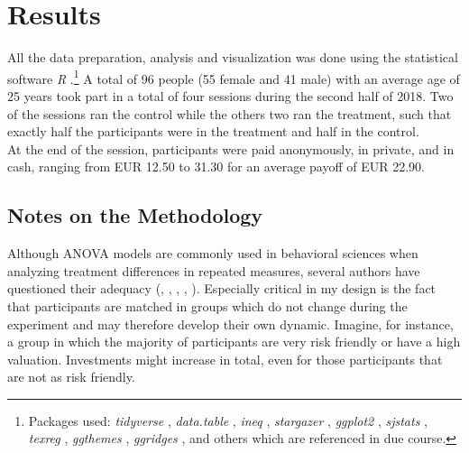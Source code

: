 \chapter{Results}
\label{ch:results}
\thispagestyle{fancy}

All the data preparation, analysis and visualization was done using the statistical software \textit{R} \citep{rcoreteam2014}.\footnote{Packages used: \textit{tidyverse} \citep{wickham2017b}, \textit{data.table} \citep{dowle2018}, \textit{ineq} \citep{zeileis2014}, \textit{stargazer} \citep{hlavac2018}, \textit{ggplot2} \citep{wickham2016}, \textit{sjstats} \citep{ludecke2018}, \textit{texreg} \citep{leifeld2013}, \textit{ggthemes} \citep{arnold2018}, \textit{ggridges} \citep{wilke2018}, and others which are referenced in due course.} A total of 96 people (55 female and 41 male) with an average age of 25 years took part in a total of four sessions during the second half of 2018. Two of the sessions ran the control while the others two ran the treatment, such that exactly half the participants were in the treatment and half in the control.\\

At the end of the session, participants were paid anonymously, in private, and in cash, ranging from EUR 12.50 to 31.30 for an average payoff of EUR 22.90.\\  %

\section{Notes on the Methodology}

Although ANOVA models are commonly used in behavioral sciences when analyzing treatment differences in repeated measures, several authors have questioned their adequacy (\cite{camilli1987}, \cite{vasey1987}, \cite{jaeger2008}, \cite{locker2007}, \cite{krueger2004}). Especially critical in my design is the fact that participants are matched in groups which do not change during the experiment and may therefore develop their own dynamic. Imagine, for instance, a group in which the majority of participants are very risk friendly or have a high valuation. Investments might increase in total, even for those participants that are not as risk friendly.\\ 
    
